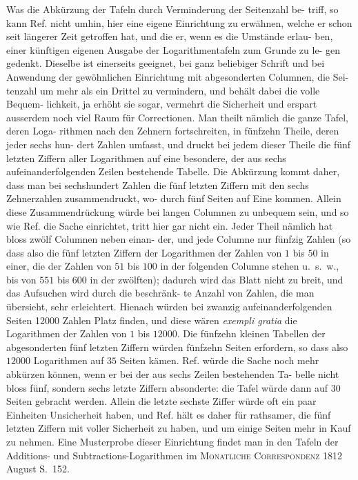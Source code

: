 \documentclass[12pt,a4paper]{article}
\begin{document}
\smallskip\noindent
Was die Abkürzung der Tafeln durch Verminderung der Seitenzahl be-
triff, so kann Ref. nicht umhin, hier eine eigene Einrichtung zu erwähnen, welche
er schon seit längerer Zeit getroffen hat, und die er, wenn es die Umstände erlau-
ben, einer künftigen eigenen Ausgabe der Logarithmentafeln zum Grunde zu le-
gen gedenkt. Dieselbe ist einerseits geeignet, bei ganz beliebiger Schrift und bei
Anwendung der gewöhnlichen Einrichtung mit abgesonderten Columnen, die Sei-
tenzahl um mehr als ein Drittel zu vermindern, und behält dabei die volle Bequem-
lichkeit, ja erhöht sie sogar, vermehrt die Sicherheit und erspart ausserdem noch
viel Raum für Correctionen. Man theilt nämlich die ganze Tafel, deren Loga-
rithmen nach den Zehnern fortschreiten, in fünfzehn Theile, deren jeder sechs hun-
dert Zahlen umfasst, und druckt bei jedem dieser Theile die fünf letzten Ziffern
aller Logarithmen auf eine besondere, der aus sechs aufeinanderfolgenden Zeilen
bestehende Tabelle. Die Abkürzung kommt daher, dass man bei sechshundert
Zahlen die fünf letzten Ziffern mit den sechs Zehnerzahlen zusammendruckt, wo-
durch fünf Seiten auf Eine kommen. Allein diese Zusammendrückung würde bei
langen Columnen zu unbequem sein, und so wie Ref. die Sache einrichtet, tritt
hier gar nicht ein. Jeder Theil nämlich hat bloss zwölf Columnen neben einan-
der, und jede Columne nur fünfzig Zahlen (so dass also die fünf letzten Ziffern
der Logarithmen der Zahlen von $1$ bis $50$ in einer, die der Zahlen von $51$ bis
$100$ in der folgenden Columne stehen u.~s.~w., bis von $551$ bis $600$ in der zwölften);
dadurch wird das Blatt nicht zu breit, und das Aufsuchen wird durch die beschränk-
te Anzahl von Zahlen, die man übersieht, sehr erleichtert. Hienach würden bei
zwanzig aufeinanderfolgenden Seiten 12000 Zahlen Platz finden, und diese wären
\textit{exempli gratia} die Logarithmen der Zahlen von $1$ bis $12000$. Die fünfzehn kleinen
Tabellen der abgesonderten fünf letzten Ziffern würden fünfzehn Seiten erfordern,
so dass also $12000$ Logarithmen auf $35$ Seiten kämen. Ref. würde die Sache
noch mehr abkürzen können, wenn er bei der aus sechs Zeilen bestehenden Ta-
belle nicht bloss fünf, sondern sechs letzte Ziffern absonderte: die Tafel würde
dann auf $30$ Seiten gebracht werden. Allein die letzte sechste Ziffer würde oft
ein paar Einheiten Unsicherheit haben, und Ref. hält es daher für rathsamer, die
fünf letzten Ziffern mit voller Sicherheit zu haben, und um einige Seiten mehr in
Kauf zu nehmen. Eine Musterprobe dieser Einrichtung findet man in den Tafeln
der Additions- und Subtractions-Logarithmen im \textsc{Monatliche Correspondenz}
1812 August S.~152.
\end{document}
